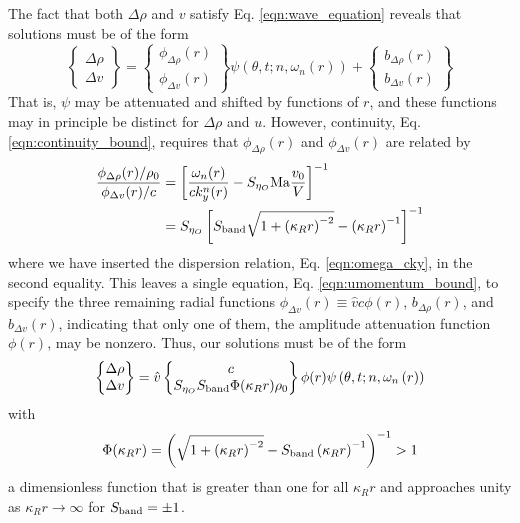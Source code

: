 \documentclass[%
 reprint,
superscriptaddress,
longbibliography,
 amsmath,amssymb,
 prl,
 citeautoscript,
]{revtex4-1}
\begin{document}
The fact that both $\Delta \rho$ and $v$ satisfy Eq. \ref{eqn:wave_equation} reveals that solutions must be of the form
\begin{equation}
\begin{Bmatrix}
\Delta \rho \\
\Delta v
\end{Bmatrix}
=
\begin{Bmatrix}
\phi_{\Delta \rho} (r) \\
\phi_{\Delta v} (r)
\end{Bmatrix}
\psi \left( \theta, t; n, \omega_n (r) \right) +
\begin{Bmatrix}
b_{\Delta \rho} (r) \\
b_{\Delta v} (r)
\end{Bmatrix}
\label{eqn:solution_form1}
\end{equation}
That is, $\psi$ may be attenuated and shifted by functions of $r$, and these functions may in principle be distinct for $\Delta \rho$ and $u$. However, continuity, Eq. \ref{eqn:continuity_bound}, requires that $\phi_{\Delta \rho}(r)$ and $\phi_{\Delta v} (r)$ are related by
\begin{equation}
\begin{split}
\frac{\phi_{\Delta \rho}(r) / \rho_0}{\phi_{\Delta v}(r) / c} &= \left[ \frac{\omega_n(r)}{c k_y^n(r)} - S_{\eta_O} {\rm Ma} \frac{v_0}{V} \right]^{-1} \\
&= S_{\eta_O} \left[ S_{\rm band} \sqrt{1 + \left( \kappa_R r \right)^{-2}} - \left( \kappa_R r \right)^{-1} \right]^{-1}
\end{split}
\label{eqn:attenuation_relation}
\end{equation}
where we have inserted the dispersion relation, Eq. \ref{eqn:omega_cky}, in the second equality. This leaves a single equation, Eq. \ref{eqn:umomentum_bound}, to specify the three remaining radial functions $\phi_{\Delta v} (r) \equiv \hat{v} c \phi (r)$, $b_{\Delta \rho} (r)$, and $b_{\Delta v} (r)$, indicating that only one of them, the amplitude attenuation function $\phi(r)$, may be nonzero. Thus, our solutions must be of the form
\begin{equation}
\begin{Bmatrix}
\Delta \rho \\
\Delta v
\end{Bmatrix}
=\hat{v}
\begin{Bmatrix}
c \\
S_{\eta_O} S_{\rm band} \Phi(\kappa_R r) \rho_0
\end{Bmatrix}
\phi(r) \psi\left( \theta , t; n, \omega_n \left( r \right) \right)
\label{eqn:solution_form2}
\end{equation}
with
\begin{equation}
\Phi(\kappa_R r) = \left( \sqrt{1 + \left( \kappa_R r \right)^{-2}} - S_{\rm band} \left( \kappa_R r \right)^{-1} \right)^{-1} > 1
\label{eqn:hat_relation}
\end{equation}
a dimensionless function that is greater than one for all $\kappa_R r$ and approaches unity as $\kappa_R r \rightarrow \infty$ for $S_{\rm band} = \pm 1$.
\end{document}
